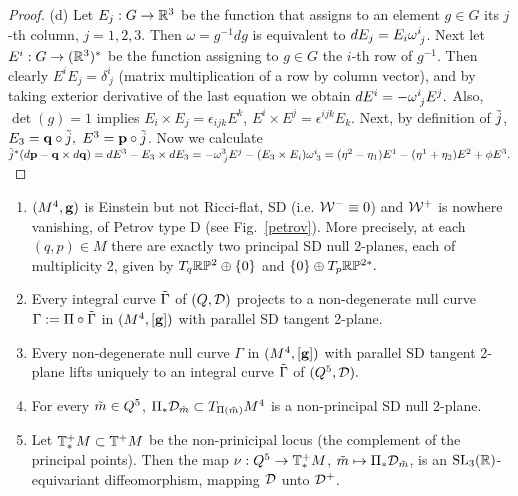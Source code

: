 \begin{proof}
\mn(d)  Let $E_j:G\to \mathbb{R}^3$ be the function that assigns  to an element $g\in G$ its   $j$-th  column, $j=1,2,3$. Then $\omega=g^{-1}dg$ is equivalent to $dE_j=E_i\omega^{i}_{\;j}$. Next let $E^i:G\to (\mathbb{R}^3)^*$ be the function  assigning to $g\in G$ 
the $i$-th row of $g^{-1}$. Then clearly $E^iE_j=\delta^i_{\,j}$ (matrix multiplication of a row by column vector), and by taking exterior derivative of the last equation  we obtain $dE^i=-\omega^{i}_{\;j}E^j.$ Also, $\det(g)= 1$ implies $E_i\times E_j=\epsilon_{ijk}E^k$, $E^i\times E^j=\epsilon^{ijk}E_k$. Next, by definition of ${\tilde j}$, $E_3=\mathbf q\circ{\tilde j},$ $E^3={\mathbf p}\circ{\tilde j}$. Now we calculate 
${\tilde j}^*(d{\mathbf p}-\mathbf q\times d\mathbf q)=dE^3-E_3\times dE_3=-\omega^{3}_{\;j}E^j-(E_3\times E_i)\omega^{i}_{\;3}=(\eta^2-\eta_1)E^1-(\eta^1+\eta_2)E^2+\phi E^3.$
\end{proof}




\begin{cor}\label{grancor}
\n\begin{enumerate}[leftmargin=18pt,label=(\alph*)]\setlength\itemsep{5pt}
\item $(M^4,\mathbf{ g})$ is Einstein but not Ricci-flat, SD (i.e. $\mathcal W^-\equiv 0$) and $\mathcal W^+$ is nowhere vanishing, of Petrov type D (see 
Fig.~\ref{petrov}). 
More precisely,  at each $(q,p)\in M$ there are exactly two principal SD null 2-planes, 
each of multiplicity 2, given by $T_q\mathbb{R}\mathbb{P}^2\oplus \{0\}$ and $\{0\}\oplus T_p\mathbb{R}\mathbb{P}^{2*}. $ 




\item Every integral curve $\tilde \Gamma$ of $(Q,{\mathcal D})$ projects to a non-degenerate null curve $\Gamma:=\Pi\circ\tilde \Gamma$ in  $(M^4,[\mathbf{ g}])$ with parallel SD tangent 2-plane. 

\item Every non-degenerate null curve $\Gamma$ in $(M^4,[\mathbf{ g}])$ with parallel SD tangent 2-plane lifts uniquely to an integral curve $\tilde \Gamma$ of $(Q^5, {\mathcal D}).$


\item For every $\tilde m\in Q^5$,  $\Pi_*{\mathcal D}_{\tilde m}\subset T_{\Pi(\tilde m)}M^4$ is a non-principal SD null 2-plane.  


\item Let $\mathbb{T}^+_*M\subset \mathbb{T}^+M$ be the non-prinicipal locus (the complement of the principal points). Then the map $\nu:Q^5\to \mathbb{T}^+_*M$, 
$\tilde m\mapsto \Pi_*{\mathcal D}_{\tilde m}$, 
is  an ${\mathrm{SL}_3(\mathbb{R})}$-equivariant diffeomorphism, mapping ${\mathcal D}$ unto ${\mathcal D}^+$. 



\end{enumerate}

\end{cor}




